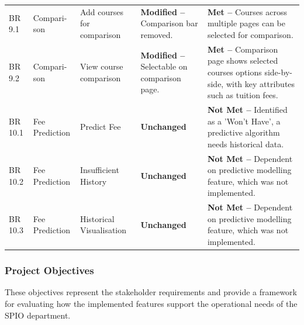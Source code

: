 \begin{xltabular}{\textwidth}{@{} l p{1.5cm} p{2.5cm} p{3.5cm} X @{}}
\midrule

BR 9.1 & Compari-son & Add courses for comparison & \textbf{Modified --} Comparison bar removed. & \textbf{Met --} Courses across multiple pages can be selected for comparison. \\
BR 9.2 & Compari-son & View course comparison & \textbf{Modified --} Selectable on comparison page. & \textbf{Met --} Comparison page shows selected courses options side-by-side, with key attributes such as tuition fees. \\

\midrule

BR 10.1 & Fee Prediction & Predict Fee & \textbf{Unchanged} & \textbf{Not Met --} Identified as a 'Won't Have', a predictive algorithm needs historical data. \\
BR 10.2 & Fee Prediction & Insufficient History & \textbf{Unchanged} & \textbf{Not Met --} Dependent on predictive modelling feature, which was not implemented. \\
BR 10.3 & Fee Prediction & Historical Visualisation & \textbf{Unchanged} & \textbf{Not Met --} Dependent on predictive modelling feature, which was not implemented. \\

\bottomrule
\end{xltabular}

\subsubsection{Project Objectives}

These objectives represent the stakeholder requirements and provide a framework for evaluating how the implemented features support the operational needs of the SPIO department. 

